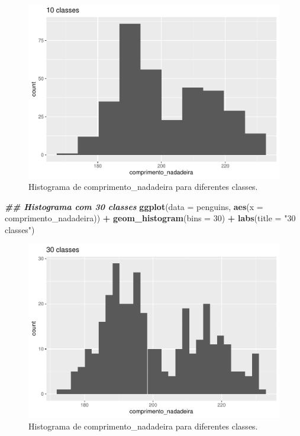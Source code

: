 \documentclass[
]{article}
\newenvironment{Shaded}{\begin{snugshade}}{\end{snugshade}}
\newcommand{\AttributeTok}[1]{\textcolor[rgb]{0.13,0.29,0.53}{#1}}
\newcommand{\DecValTok}[1]{\textcolor[rgb]{0.00,0.00,0.81}{#1}}
\newcommand{\DocumentationTok}[1]{\textcolor[rgb]{0.56,0.35,0.01}{\textbf{\textit{#1}}}}
\newcommand{\FunctionTok}[1]{\textcolor[rgb]{0.13,0.29,0.53}{\textbf{#1}}}
\newcommand{\NormalTok}[1]{#1}
\newcommand{\SpecialCharTok}[1]{\textcolor[rgb]{0.81,0.36,0.00}{\textbf{#1}}}
\newcommand{\StringTok}[1]{\textcolor[rgb]{0.31,0.60,0.02}{#1}}
\begin{document}
\begin{figure}
\centering
\includegraphics{epr_files/figure-latex/fig-hist-bins-1.pdf}
\caption{\label{fig:fig-hist-bins-1}Histograma de comprimento\_nadadeira para diferentes classes.}
\end{figure}

\begin{Shaded}
\begin{Highlighting}[]
\DocumentationTok{\#\# Histograma com 30 classes}
\FunctionTok{ggplot}\NormalTok{(}\AttributeTok{data =}\NormalTok{ penguins, }
       \FunctionTok{aes}\NormalTok{(}\AttributeTok{x =}\NormalTok{ comprimento\_nadadeira)) }\SpecialCharTok{+}
    \FunctionTok{geom\_histogram}\NormalTok{(}\AttributeTok{bins =} \DecValTok{30}\NormalTok{) }\SpecialCharTok{+}
    \FunctionTok{labs}\NormalTok{(}\AttributeTok{title =} \StringTok{"30 classes"}\NormalTok{)}
\end{Highlighting}
\end{Shaded}

\begin{figure}
\centering
\includegraphics{epr_files/figure-latex/fig-hist-bins-2.pdf}
\caption{\label{fig:fig-hist-bins-2}Histograma de comprimento\_nadadeira para diferentes classes.}
\end{figure}
\end{document}
